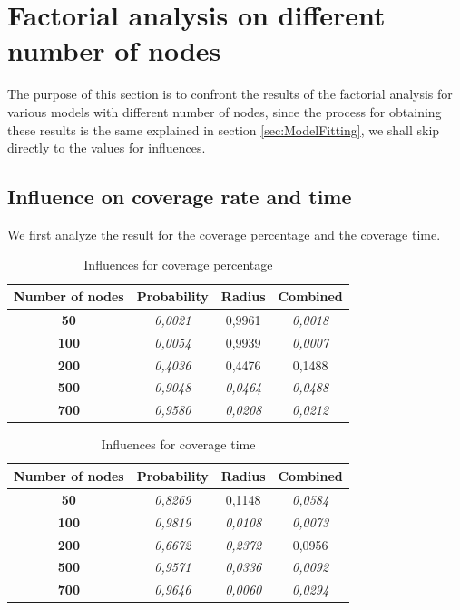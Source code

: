 \section{Factorial analysis on different number of nodes}
The purpose of this section is to confront the results of the factorial analysis for various models with different number of nodes, since the process for obtaining these results is the same explained in section \ref{sec:ModelFitting}, we shall skip directly to the values for influences.
\subsection{Influence on coverage rate and time}
We first analyze the result for the coverage percentage and the coverage time.

\begin{table}[H]\label{tab:CovPerc}
\centering
\begin{tabular}{|c|c|c|c|}
\hline
\textbf{Number of   nodes} & \textbf{Probability} & \textbf{Radius} & \textbf{Combined} \\ \hline
\textbf{50} & \textit{0,0021} & 0,9961 & \textit{0,0018} \\ \hline
\textbf{100} & \textit{0,0054} & 0,9939 & \textit{0,0007} \\ \hline
\textbf{200} & \textit{0,4036} & 0,4476 & 0,1488 \\ \hline
\textbf{500} & \textit{0,9048} & \textit{0,0464} & \textit{0,0488} \\ \hline
\textbf{700} & \textit{0,9580} & \textit{0,0208} & \textit{0,0212} \\ \hline
\end{tabular}
\caption{Influences for coverage percentage}
\end{table}

\begin{table}[H]\label{tab:CovTime}
\centering
\begin{tabular}{|c|c|c|c|}
\hline
\textbf{Number of   nodes} & \textbf{Probability} & \textbf{Radius} & \textbf{Combined} \\ \hline
\textbf{50} & \textit{0,8269} & 0,1148 & \textit{0,0584} \\ \hline
\textbf{100} & \textit{0,9819} & \textit{0,0108} & \textit{0,0073} \\ \hline
\textbf{200} & \textit{0,6672} & \textit{0,2372} & 0,0956 \\ \hline
\textbf{500} & \textit{0,9571} & \textit{0,0336} & \textit{0,0092} \\ \hline
\textbf{700} & \textit{0,9646} & \textit{0,0060} & \textit{0,0294} \\ \hline
\end{tabular}
\caption{Influences for coverage time}
\end{table}


